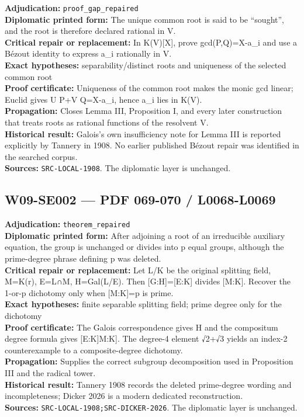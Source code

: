 \documentclass[
  10pt,
  a4paper,
]{scrreprt}
\begin{document}
\textbf{Adjudication:} \texttt{proof\_gap\_repaired}\\
\textbf{Diplomatic printed form:} The unique common root is said to be
``sought'', and the root is therefore declared rational in V.\\
\textbf{Critical repair or replacement:} In K(V){[}X{]}, prove
gcd(P,Q)=X-a\_i and use a Bézout identity to express a\_i rationally in
V.\\
\textbf{Exact hypotheses:} separability/distinct roots and uniqueness of
the selected common root\\
\textbf{Proof certificate:} Uniqueness of the common root makes the
monic gcd linear; Euclid gives U P+V Q=X-a\_i, hence a\_i lies in
K(V).\\
\textbf{Propagation:} Closes Lemma III, Proposition I, and every later
construction that treats roots as rational functions of the resolvent
V.\\
\textbf{Historical result:} Galois's own insufficiency note for Lemma
III is reported explicitly by Tannery in 1908. No earlier published
Bézout repair was identified in the searched corpus.\\
\textbf{Sources:} \texttt{SRC-LOCAL-1908}. The diplomatic layer is
unchanged.

\subsection{W09-SE002 --- PDF 069-070 /
L0068-L0069}\label{w09-se002-pdf-069-070-l0068-l0069}

\textbf{Adjudication:} \texttt{theorem\_repaired}\\
\textbf{Diplomatic printed form:} After adjoining a root of an
irreducible auxiliary equation, the group is unchanged or divides into p
equal groups, although the prime-degree phrase defining p was deleted.\\
\textbf{Critical repair or replacement:} Let L/K be the original
splitting field, M=K(r), E=L∩M, H=Gal(L/E). Then {[}G:H{]}={[}E:K{]}
divides {[}M:K{]}. Recover the 1-or-p dichotomy only when {[}M:K{]}=p is
prime.\\
\textbf{Exact hypotheses:} finite separable splitting field; prime
degree only for the dichotomy\\
\textbf{Proof certificate:} The Galois correspondence gives H and the
compositum degree formula gives {[}E:K{]}\textbar{[}M:K{]}. The degree-4
element √2+√3 yields an index-2 counterexample to a composite-degree
dichotomy.\\
\textbf{Propagation:} Supplies the correct subgroup decomposition used
in Proposition III and the radical tower.\\
\textbf{Historical result:} Tannery 1908 records the deleted
prime-degree wording and incompleteness; Dicker 2026 is a modern
dedicated reconstruction.\\
\textbf{Sources:} \texttt{SRC-LOCAL-1908;SRC-DICKER-2026}. The
diplomatic layer is unchanged.
\end{document}
